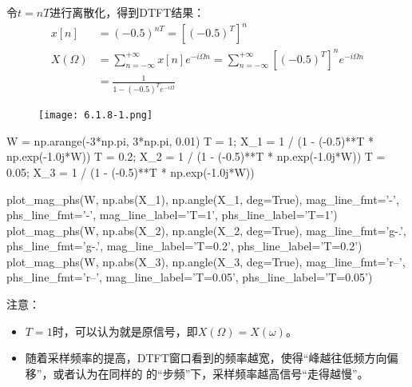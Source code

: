 令$t=nT$进行离散化，得到DTFT结果：
\begin{align*}
x\left[ n \right] &=\left( -0.5 \right) ^{nT}=\left[ \left( -0.5 \right) ^T \right] ^n \\
X\left( \varOmega \right) &=\sum_{n=-\infty}^{+\infty}{x\left[ n \right] e^{-i\varOmega n}}=\sum_{n=-\infty}^{+\infty}{\left[ \left( -0.5 \right) ^T \right] ^ne^{-i\varOmega n}} \\
&=\frac{1}{1-\left( -0.5 \right) ^Te^{-i\varOmega}}
\end{align*}
\begin{figure}[h]
\centering
\texttt{[image: 6.1.8-1.png]}
\end{figure}

\begin{python}
W = np.arange(-3*np.pi, 3*np.pi, 0.01)
T = 1;    X_1 = 1 / (1 - (-0.5)**T * np.exp(-1.0j*W))
T = 0.2;  X_2 = 1 / (1 - (-0.5)**T * np.exp(-1.0j*W))
T = 0.05; X_3 = 1 / (1 - (-0.5)**T * np.exp(-1.0j*W))

plot_mag_phs(W, np.abs(X_1), np.angle(X_1, deg=True),
             mag_line_fmt='-', phs_line_fmt='-',
             mag_line_label='T=1', phs_line_label='T=1')
plot_mag_phs(W, np.abs(X_2), np.angle(X_2, deg=True),
             mag_line_fmt='g-.', phs_line_fmt='g-.',
             mag_line_label='T=0.2', phs_line_label='T=0.2')
plot_mag_phs(W, np.abs(X_3), np.angle(X_3, deg=True),
             mag_line_fmt='r--', phs_line_fmt='r--',
             mag_line_label='T=0.05', phs_line_label='T=0.05')
\end{python}

注意：
\begin{itemize}
    \item $T=1$时，可以认为就是原信号，即$X\left( \varOmega \right) =X\left( \omega \right) $。
    \item 随着采样频率的提高，DTFT窗口看到的频率越宽，使得“峰越往低频方向偏移”，或者认为在同样的 的“步频”下，采样频率越高信号“走得越慢”。
\end{itemize}




